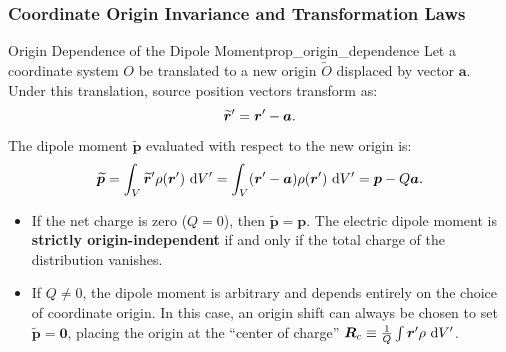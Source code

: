\subsubsection{Coordinate Origin Invariance and Transformation Laws}

\begin{proposition}{Origin Dependence of the Dipole Moment}{prop_origin_dependence}
Let a coordinate system \(O\) be translated to a new origin \(\widetilde{O}\) displaced by vector \(\bm{a}\). Under this translation, source position vectors transform as:
\begin{equation}
    \widetilde{\bm{r}}' = \bm{r}' - \bm{a}.
\end{equation}
The dipole moment \(\widetilde{\bm{p}}\) evaluated with respect to the new origin is:
\begin{equation}
    \widetilde{\bm{p}} = \int_V \widetilde{\bm{r}}'\rho(\bm{r}')\,\dd{V'} = \int_V (\bm{r}' - \bm{a})\rho(\bm{r}')\,\dd{V'} = \bm{p} - Q\bm{a}.
\end{equation}
\end{proposition}

\begin{remark}
\leavevmode
\begin{itemize}
    \item If the net charge is zero (\(Q = 0\)), then \(\widetilde{\bm{p}} = \bm{p}\). The electric dipole moment is \textbf{strictly origin-independent} if and only if the total charge of the distribution vanishes.
    \item If \(Q \neq 0\), the dipole moment is arbitrary and depends entirely on the choice of coordinate origin. In this case, an origin shift can always be chosen to set \(\widetilde{\bm{p}} = \bm{0}\), placing the origin at the ``center of charge'' \(\bm{R}_c \equiv \frac{1}{Q}\int \bm{r}'\rho\,\dd{V'}\).
\end{itemize}
\end{remark}

